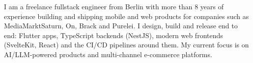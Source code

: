 \documentclass[10pt,a4paper,normalphoto]{altacv}
\begin{document}








\begin{fullwidth}
\makecvheader
\end{fullwidth}

\begin{fullwidth}
I am a freelance fullstack engineer from Berlin with more than 8 years of experience building and shipping mobile and web products for companies such as MediaMarktSaturn, On, Brack and Purelei. I design, build and release end to end: Flutter apps, TypeScript backends (NestJS), modern web frontends (SvelteKit, React) and the CI/CD pipelines around them. My current focus is on AI/LLM-powered products and multi-channel e-commerce platforms.
\end{fullwidth}
\end{document}

